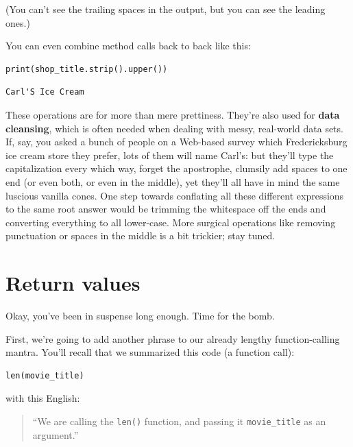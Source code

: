 (You can't see the trailing spaces in the output, but you can see the leading
ones.)

You can even combine method calls back to back like this:

\begin{Verbatim}[fontsize=\small,samepage=true,frame=single,framesep=3mm]
print(shop_title.strip().upper())
\end{Verbatim}

\begin{Verbatim}[fontsize=\small,samepage=true,frame=leftline,framesep=5mm,framerule=1mm]
Carl'S Ice Cream
\end{Verbatim}

These operations are for more than mere prettiness. They're also used for
\textbf{data cleansing}, which is often needed when dealing with messy,
real-world data sets. If, say, you asked a bunch of people on a Web-based
survey which Fredericksburg ice cream store they prefer, lots of them will name
Carl's: but they'll type the capitalization every which way, forget the
apostrophe, clumsily add spaces to one end (or even both, or even in the
middle), yet they'll all have in mind the same luscious vanilla cones. One step
towards conflating all these different expressions to the same root answer
would be trimming the whitespace off the ends and converting everything to all
lower-case. More surgical operations like removing punctuation or spaces in the
middle is a bit trickier; stay tuned.

\section{Return values}

Okay, you've been in suspense long enough. Time for the bomb.

First, we're going to add another phrase to our already lengthy
function-calling mantra. You'll recall that we summarized this code (a function
call):

\begin{Verbatim}[fontsize=\small,samepage=true,frame=single,framesep=3mm]
len(movie_title)
\end{Verbatim}

with this English:

\begin{quote}
``We are calling the \texttt{len()} function, and passing it
\texttt{movie\_title} as an argument.''
\end{quote}

